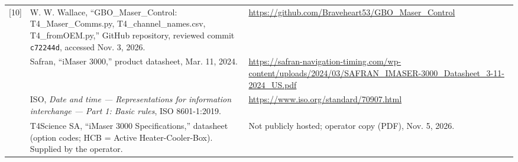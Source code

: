 \documentclass[11pt,a4paper]{article}
\begin{document}
\begin{longtable}{@{}p{.05\linewidth}p{.53\linewidth}p{.34\linewidth}@{}}
[10] & W. W. Wallace, ``GBO\_Maser\_Control: T4\_Maser\_Comms.py,
T4\_channel\_names.csv, T4\_fromOEM.py,'' GitHub repository, reviewed commit
\texttt{c72244d}, accessed Nov. 3, 2026.
& \url{https://github.com/Braveheart53/GBO_Maser_Control}\\[5pt]
[11] & Safran, ``iMaser 3000,'' product datasheet, Mar. 11, 2024.
& \url{https://safran-navigation-timing.com/wp-content/uploads/2024/03/SAFRAN_IMASER-3000_Datasheet_3-11-2024_US.pdf}\\[5pt]
[12] & ISO, \textit{Date and time --- Representations for information interchange ---
Part 1: Basic rules}, ISO 8601-1:2019.
& \url{https://www.iso.org/standard/70907.html}\\[5pt]
[13] & T4Science SA, ``iMaser 3000 Specifications,'' datasheet (option codes; HCB = Active
Heater-Cooler-Box). Supplied by the operator.
& Not publicly hosted; operator copy (PDF), Nov. 5, 2026.\\
\bottomrule
\end{longtable}
\normalsize
\end{document}
